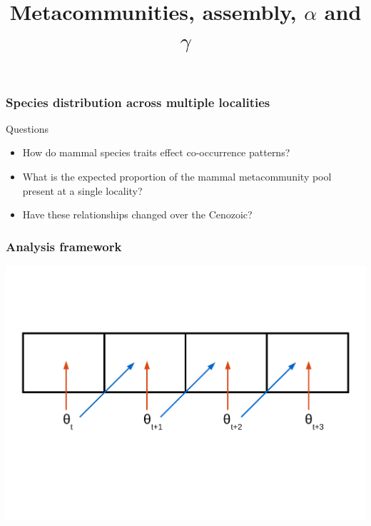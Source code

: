 \documentclass{beamer}
\title{Metacommunities, assembly, \(\alpha\) and \(\gamma\)}
\begin{document}
\begin{frame}
  \maketitle
\end{frame}

\begin{frame}
  \frametitle{Species distribution across multiple localities}

  \begin{block}{Questions}
    \begin{itemize}
      \item How do mammal species traits effect co-occurrence patterns?
      \item What is the expected proportion of the mammal metacommunity pool present at a single locality?
      \item Have these relationships changed over the Cenozoic?
    \end{itemize}
  \end{block}
\end{frame}

\begin{frame}
  \frametitle{Analysis framework}
  \begin{center}
    \includegraphics[height = 0.8\textheight, width = \textwidth,  keepaspectratio = true]{figure/predict_perform}
  \end{center}
\end{frame}
\end{document}
